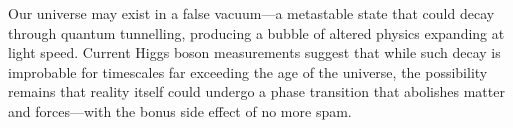 Our universe may exist in a false vacuum—a metastable state that could decay through quantum tunnelling, producing a bubble of altered physics expanding at light speed. Current Higgs boson measurements suggest that while such decay is improbable for timescales far exceeding the age of the universe, the possibility remains that reality itself could undergo a phase transition that abolishes matter and forces—with the bonus side effect of no more spam.